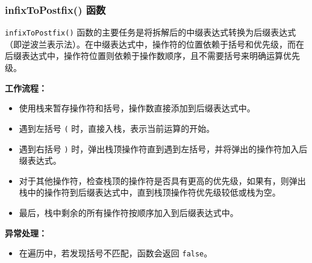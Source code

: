 \documentclass[UTF8]{ctexart}
\begin{document}
\subsubsection{infixToPostfix() 函数}

\texttt{infixToPostfix()} 函数的主要任务是将拆解后的中缀表达式转换为后缀表达式（即逆波兰表示法）。在中缀表达式中，操作符的位置依赖于括号和优先级，而在后缀表达式中，操作符位置则依赖于操作数顺序，且不需要括号来明确运算优先级。

\textbf{工作流程：}
\begin{itemize}
    \item 使用栈来暂存操作符和括号，操作数直接添加到后缀表达式中。
    \item 遇到左括号 \texttt{(} 时，直接入栈，表示当前运算的开始。
    \item 遇到右括号 \texttt{)} 时，弹出栈顶操作符直到遇到左括号，并将弹出的操作符加入后缀表达式。
    \item 对于其他操作符，检查栈顶的操作符是否具有更高的优先级，如果有，则弹出栈中的操作符到后缀表达式中，直到栈顶操作符优先级较低或栈为空。
    \item 最后，栈中剩余的所有操作符按顺序加入到后缀表达式中。
\end{itemize}

\textbf{异常处理：}
\begin{itemize}
    \item 在遍历中，若发现括号不匹配，函数会返回 \texttt{false}。
\end{itemize}
\end{document}
